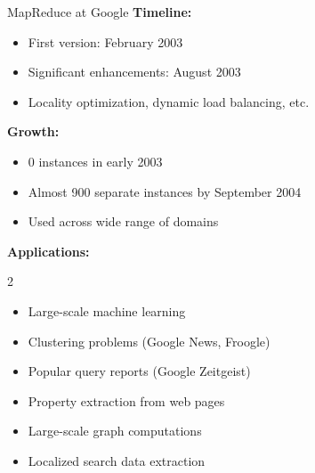 \documentclass[aspectratio=169]{beamer}
\begin{document}
\begin{frame}{MapReduce at Google}
\textbf{Timeline:}
\begin{itemize}
    \item First version: February 2003
    \item Significant enhancements: August 2003
    \item Locality optimization, dynamic load balancing, etc.
\end{itemize}

\vspace{0.3cm}

\textbf{Growth:}
\begin{itemize}
    \item 0 instances in early 2003
    \item Almost 900 separate instances by September 2004
    \item Used across wide range of domains
\end{itemize}

\vspace{0.3cm}

\textbf{Applications:}
\begin{multicols}{2}
\begin{itemize}
    \item Large-scale machine learning
    \item Clustering problems (Google News, Froogle)
    \item Popular query reports (Google Zeitgeist)
    \item Property extraction from web pages
    \item Large-scale graph computations
    \item Localized search data extraction
\end{itemize}
\end{multicols}
\end{frame}
\end{document}
